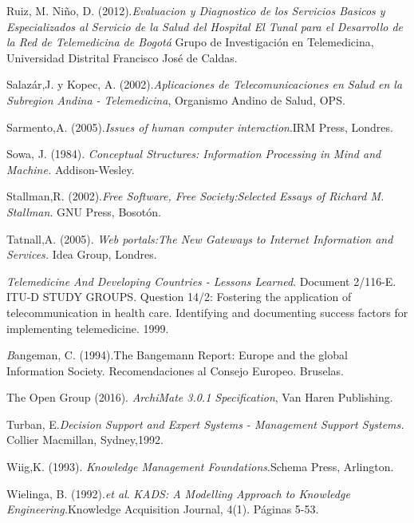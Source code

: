 \begin{thebibliography}{}
 Ruiz, M. Niño, D. (2012).\textit{Evaluacion y Diagnostico de los Servicios Basicos y Especializados al Servicio de la Salud del Hospital El Tunal para el Desarrollo de la Red de Telemedicina de Bogotá} Grupo de Investigación en Telemedicina,  Universidad Distrital Francisco José de Caldas.

 Salazár,J. y Kopec, A. (2002).\textit{Aplicaciones de Telecomunicaciones en Salud en la Subregion Andina - Telemedicina}, Organismo Andino de Salud, OPS.

 Sarmento,A. (2005).\textit{Issues of human computer interaction}.IRM Press, Londres. 

 Sowa, J. (1984). \textit{Conceptual Structures: Information Processing in Mind and Machine.} Addison-Wesley.

 Stallman,R. (2002).\textit{Free Software, Free Society:Selected Essays of Richard M. Stallman}. GNU Press, Bosotón.

 Tatnall,A. (2005). \textit{Web portals:The New Gateways to Internet Information and Services.} Idea Group, Londres.

 \textit{Telemedicine And Developing Countries - Lessons Learned}. Document 2/116-E. ITU-D STUDY GROUPS. Question 14/2: Fostering the application of telecommunication in health care.  Identifying and documenting success factors for implementing telemedicine. 1999.

 \textit Bangeman, C. (1994).{The Bangemann Report: Europe and the global Information Society. Recomendaciones al Consejo Europeo.} Bruselas.

 The Open Group (2016). \textit{ArchiMate 3.0.1 Specification}, Van Haren Publishing.

 Turban, E.\textit{Decision Support and Expert Systems - Management Support Systems.} Collier Macmillan, Sydney,1992.

 Wiig,K. (1993). \textit{Knowledge Management Foundations}.Schema Press, Arlington. 

 Wielinga, B. (1992).\textit{et al}. \textit{KADS: A Modelling Approach to Knowledge Engineering.}Knowledge Acquisition Journal, 4(1). Páginas 5-53.


\end{thebibliography}

